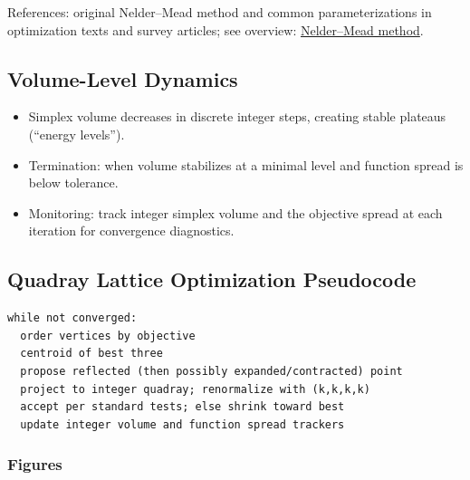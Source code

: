 \documentclass[
  10pt,
]{article}
\providecommand{\tightlist}{%
  \setlength{\itemsep}{0pt}\setlength{\parskip}{0pt}}
\begin{document}
References: original Nelder--Mead method and common parameterizations in
optimization texts and survey articles; see overview:
\href{https://en.wikipedia.org/wiki/Nelder\%E2\%80\%93Mead_method}{Nelder--Mead
method}.

\hypertarget{volume-level-dynamics}{%
\subsection{Volume-Level Dynamics}\label{volume-level-dynamics}}

\begin{itemize}
\tightlist
\item
  Simplex volume decreases in discrete integer steps, creating stable
  plateaus (``energy levels'').
\item
  Termination: when volume stabilizes at a minimal level and function
  spread is below tolerance.
\item
  Monitoring: track integer simplex volume and the objective spread at
  each iteration for convergence diagnostics.
\end{itemize}

\hypertarget{code:nelder_mead_on_integer_lattice}{%
\subsection{Quadray Lattice Optimization
Pseudocode}\label{code:nelder_mead_on_integer_lattice}}

\begin{lstlisting}
while not converged:
  order vertices by objective
  centroid of best three
  propose reflected (then possibly expanded/contracted) point
  project to integer quadray; renormalize with (k,k,k,k)
  accept per standard tests; else shrink toward best
  update integer volume and function spread trackers
\end{lstlisting}

\hypertarget{figures}{%
\subsubsection{Figures}\label{figures}}
\end{document}
